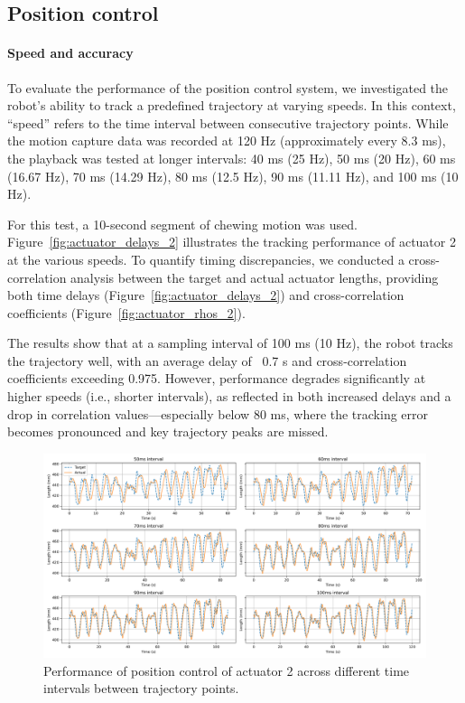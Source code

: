 \subsection{Position control}

\paragraph{Speed and accuracy}
To evaluate the performance of the position control system, we investigated the robot's ability to track a predefined trajectory at varying speeds. 
In this context, “speed” refers to the time interval between consecutive trajectory points. While the motion capture data was recorded at 120 Hz 
(approximately every 8.3 ms), the playback was tested at longer intervals: 40 ms (25 Hz), 50 ms (20 Hz), 60 ms (16.67 Hz), 70 ms (14.29 Hz), 80 ms 
(12.5 Hz), 90 ms (11.11 Hz), and 100 ms (10 Hz).

For this test, a 10-second segment of chewing motion was used. Figure~\ref{fig:actuator_delays_2} illustrates the tracking performance of actuator 2 
at the various speeds. To quantify timing discrepancies, we conducted a cross-correlation analysis between the target and actual actuator lengths, 
providing both time delays (Figure~\ref{fig:actuator_delays_2}) and cross-correlation coefficients (Figure~\ref{fig:actuator_rhos_2}).

The results show that at a sampling interval of 100 ms (10 Hz), the robot tracks the trajectory well, with an average delay of ~0.7 s and 
cross-correlation coefficients exceeding 0.975. However, performance degrades significantly at higher speeds (i.e., shorter intervals), 
as reflected in both increased delays and a drop in correlation values—especially below 80 ms, where the tracking error becomes pronounced 
and key trajectory peaks are missed.

\begin{figure}[H]
    \centering
    \includegraphics[width=\textwidth]{figures/actuator_2_trajectories.png}
    \caption{Performance of position control of actuator 2 across different time intervals between trajectory points.}
    \label{fig:position_control}
\end{figure}

